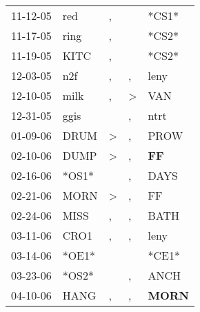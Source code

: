 \begin{supertabular}{p{0.07\textwidth}p{0.06\textwidth}p{0.02\textwidth}p{0.02\textwidth}p{0.06\textwidth}}
          11-12-05\textsuperscript{} &            red\textsuperscript{} &                , &               &                            *CS1* \\
          11-17-05\textsuperscript{} &           ring\textsuperscript{} &                , &               &                            *CS2* \\
          11-19-05\textsuperscript{} &           KITC\textsuperscript{} &                , &               &                            *CS2* \\
          12-03-05\textsuperscript{} &            n2f\textsuperscript{} &                , &             , &           leny\textsuperscript{} \\
          12-10-05\textsuperscript{} &           milk\textsuperscript{} &                , &  \textgreater &            VAN\textsuperscript{} \\
          12-31-05\textsuperscript{} &           ggis\textsuperscript{} &                  &             , &           ntrt\textsuperscript{} \\
          01-09-06\textsuperscript{} &           DRUM\textsuperscript{} &     \textgreater &             , &           PROW\textsuperscript{} \\
          02-10-06\textsuperscript{} &           DUMP\textsuperscript{} &     \textgreater &             , &    \textbf{FF\textsuperscript{}} \\
          02-16-06\textsuperscript{} &                            *OS1* &                  &             , &           DAYS\textsuperscript{} \\
          02-21-06\textsuperscript{} &           MORN\textsuperscript{} &     \textgreater &             , &             FF\textsuperscript{} \\
          02-24-06\textsuperscript{} &           MISS\textsuperscript{} &                , &             , &           BATH\textsuperscript{} \\
          03-11-06\textsuperscript{} &           CRO1\textsuperscript{} &                , &             , &           leny\textsuperscript{} \\
          03-14-06\textsuperscript{} &                            *OE1* &                  &               &                            *CE1* \\
          03-23-06\textsuperscript{} &                            *OS2* &                  &             , &           ANCH\textsuperscript{} \\
          04-10-06\textsuperscript{} &           HANG\textsuperscript{} &                , &             , &  \textbf{MORN\textsuperscript{}} \\

\end{supertabular}
